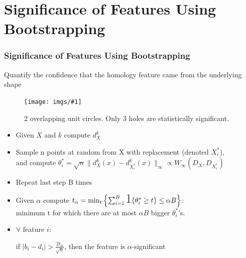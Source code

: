 \documentclass[9pt, dvipsnames]{beamer} %
\def\norm#1{\mathopen\| #1 \mathclose\|}%
\newcommand {\image}[3] {
    \begin{figure}
        \begin{center}
		\texttt{[image: imgs/\#1]}
		\caption{#2}
        \end{center}
    \end{figure}
}
\begin{document}
    \section{Significance of Features Using Bootstrapping}\label{sec:boot}
    \def\dk{d_X^k}
    \begin{frame}
	    \frametitle{\textbf{Significance of Features Using Bootstrapping}}
	    \center
		Quantify the confidence that the homology feature came from the underlying shape
		\image{bootstrapping.png}{2 overlapping unit circles. Only 3 holes are statistically significant.}{0.9}
    \end{frame}
    \begin{frame}
	    \begin{itemize}
		    \item
			    Given $X$ and $k$ compute $\dk$
		    \item
			    Sample n points at random from X with replacement (denoted $X_i^*$),\\
			    and compute $\theta_i^* =  \sqrt{n} \norm{\dk(x) - d_{X_i^*}^k(x)}_\infty \propto W_\infty \left( D_X, D_{X_i^*} \right)$
		    \item
			    Repeat last step B times
		    \item
			    Given $\alpha$ compute $t_\alpha = \min_t \left\{ \sum_{i=1}^B \text{\LARGE{1}}\{\theta_i^* \geq t\} \leq \alpha B \right\}$:\\
			    minimum t for which there are at most $\alpha B$ bigger $\theta_i^*$'s.
		    \item
			    $\forall$ feature $i$:\\
			    \centerline{if $|b_i-d_i| > \frac{2t_\alpha}{\sqrt{n}}$, then the feature is $\alpha$-significant}
	    \end{itemize}

    \end{frame}
\end{document}
